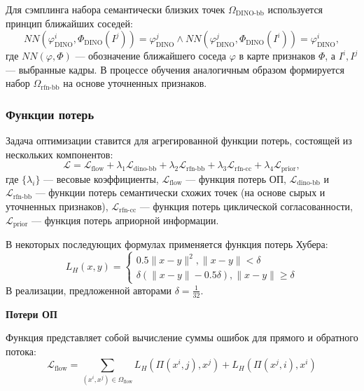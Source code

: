 \documentclass[a4paper, 14pt]{extarticle}
\theoremstyle{definition}
\theoremstyle{plain}
\theoremstyle{remark}
\begin{document}
Для сэмплинга набора семантически близких точек $\Omega_{\text{DINO-bb}}$ используется принцип ближайших соседей:
\begin{equation}
	NN(\varphi_{\text{DINO}}^i, \Phi_{\text{DINO}}({I}^j)) = \varphi_{\text{DINO}}^j \land NN(\varphi_{\text{DINO}}^j, \Phi_{\text{DINO}}({I}^i)) = \varphi_{\text{DINO}}^i,
\end{equation}
где $NN(\varphi, \Phi)$ --- обозначение ближайшего соседа $\varphi$ в карте признаков $\Phi$, а $I^i, I^j$ --- выбранные кадры.
В процессе обучения аналогичным образом формируется набор $\Omega_{\text{rfn-bb}}$ на основе уточненных признаков.

\subsubsection{Функции потерь}
Задача оптимизации ставится для агрегированной функции потерь, состоящей из нескольких компонентов:
\begin{equation} \label{eq:loss}
	\mathcal{L} = \mathcal{L}_{\text{flow}} + \lambda_1 \mathcal{L}_{\text{dino-bb}} + \lambda_2 \mathcal{L}_{\text{rfn-bb}} + \lambda_3 \mathcal{L}_{\text{rfn-cc}} + \lambda_4 \mathcal{L}_{\text{prior}},
\end{equation}
где $\{\lambda_i\}$ --- весовые коэффициенты, $\mathcal{L}_{\text{flow}}$ --- функция потерь ОП, $\mathcal{L}_{\text{dino-bb}}$ и $\mathcal{L}_{\text{rfn-bb}}$ --- функции потерь семантически схожих точек (на основе сырых и уточненных признаков), $\mathcal{L}_{\text{rfn-cc}}$ --- функция потерь циклической согласованности, $\mathcal{L}_{\text{prior}}$ --- функция потерь априорной информации.

В некоторых последующих формулах применяется функция потерь Хубера:
\begin{equation}
	L_H(x, y) = \begin{cases}
		0.5\|x-y\|^2, \|x - y\| < \delta \\
		\delta(\|x-y\| - 0.5\delta), \|x-y\| \ge \delta
	\end{cases}
\end{equation}
В реализации, предложенной авторами $\delta=\frac{1}{32}$.

\textbf{Потери ОП}

Функция представляет собой вычисление суммы ошибок для прямого и обратного потока:
\begin{equation}
	\mathcal{L}_{\text{flow}} = \sum_{(x^i, x^j) \in \Omega_{\text{flow}}} L_H(\Pi(x^i, j), x^j) + L_H(\Pi(x^j, i), x^i)
\end{equation}
\end{document}
